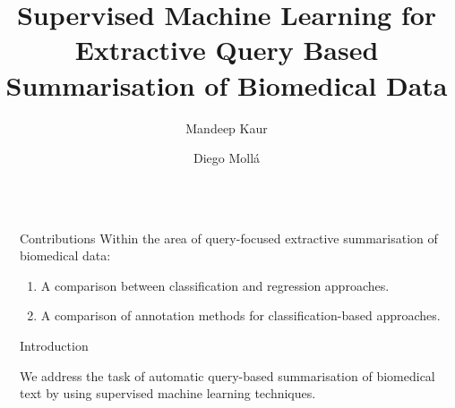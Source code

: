 \documentclass[final]{beamer}
\title{Supervised Machine Learning for Extractive Query Based Summarisation of Biomedical Data} %
\author{Mandeep Kaur \and Diego Moll\'a} %
\institute{Macquarie University} %
\newlength{\sepwid}
\newlength{\onecolwid}
\begin{document}

\setlength{\belowcaptionskip}{2ex} %
\setlength\belowdisplayshortskip{2ex} %

\begin{frame}[t] %

\vspace{-1cm}

\begin{columns}[t] %

\begin{column}{\sepwid}\end{column} %

\begin{column}{\onecolwid} %


\begin{alertblock}{Contributions}
Within the area of query-focused extractive summarisation of biomedical data:
\begin{enumerate}
\item A comparison between classification and regression approaches.
\item A comparison of annotation methods for classification-based approaches.
\end{enumerate}

\end{alertblock}


\begin{block}{Introduction}

We address the task of automatic query-based summarisation of biomedical text by using supervised machine learning techniques.


\end{block}
\end{column}
\end{columns}
\end{frame}
\end{document}
